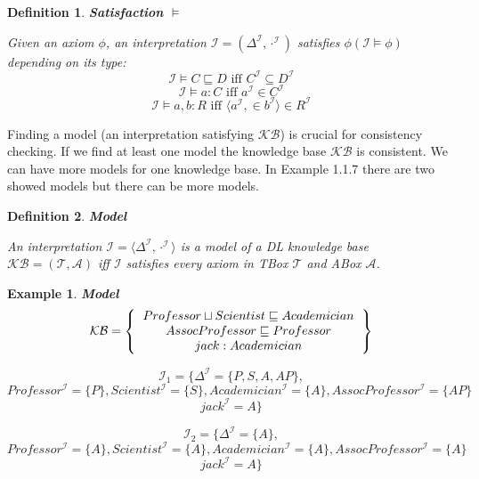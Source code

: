 \documentclass[12pt,a4paper]{article}
\newtheorem{definition}{Definition}[subsection]
\newtheorem{example}{Example}[subsection]
\begin{document}
\begin{definition}{\textbf{Satisfaction $\models$}}

	Given an axiom $\phi$, an interpretation $\mathcal{I} = (\Delta^{\mathcal{I}}, \cdot ^{\mathcal{I}})$ satisfies $\phi (\mathcal{I} \models \phi)$ depending on its type:
	\[ \mathcal{I} \models C \sqsubseteq D \text{ iff } C^{\mathcal{I}} \subseteq D^{\mathcal{I}} \]
	\[ \mathcal{I} \models a:C \text{ iff } a^{\mathcal{I}} \in C^{\mathcal{I}} \]
	\[ \mathcal{I} \models a,b:R \text{ iff } \langle a^{\mathcal{I}}, \in b^{\mathcal{I}} \rangle \in R^{\mathcal{I}} \]	
\end{definition}

Finding a model (an interpretation satisfying $\mathcal{KB}$) is crucial for consistency checking. If we find at least one model the knowledge base $\mathcal{KB}$ is consistent. We can have more models for one knowledge base. In Example 1.1.7 there are two showed models but there can be more models. 

\begin{definition}{\textbf{Model}}
	
	An interpretation $\mathcal{I} = \langle \Delta^{\mathcal{I}}, \cdot ^{\mathcal{I}}  \rangle$ is a model of a DL knowledge base $\mathcal{KB} = (\mathcal{T}, \mathcal{A})$ iff $\mathcal{I}$ satisfies every axiom in TBox $\mathcal{T}$ and ABox $\mathcal{A}$.
\end{definition}

\begin{example}{\textbf{Model}}
	\[ 
	\mathcal{KB} = \left\{
	\begin{tabular}{c c}
	$Professor \sqcup Scientist \sqsubseteq Academician$ \\
	$AssocProfessor \sqsubseteq Professor$ \\
	$jack : Academician$ \\
	\end{tabular}
	\right \}
	\]

	\[ \mathcal{I}_{1} = \{  \Delta^{\mathcal{I}} = \{ P,S,A,AP \}, \]	
	\[ Professor^{\mathcal{I}} = \{P\}, Scientist^{\mathcal{I}} = \{S\}, Academician^{\mathcal{I}} = \{A\}, AssocProfessor^{\mathcal{I}} = \{AP\} \]
	\[ jack^{\mathcal{I}} = A \} \]	

	\[ \mathcal{I}_{2} = \{  \Delta^{\mathcal{I}} = \{ A \}, \]	
	\[ Professor^{\mathcal{I}} = \{A\}, Scientist^{\mathcal{I}} = \{A\}, Academician^{\mathcal{I}} = \{A\}, AssocProfessor^{\mathcal{I}} = \{A\} \]
	\[ jack^{\mathcal{I}} = A \} \]		
\end{example}
\end{document}
